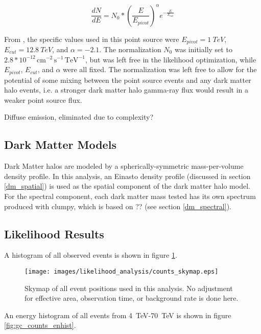  \begin{equation}\label{eqn:brokenplaw}
    \frac{dN}{dE} = N_{0} * { \left ( \frac{E}{E_{pivot}} \right ) }^{\alpha} {e}^{-\frac{E}{E_{cut}}}
  \end{equation}
  
  From \cite{VeritasGCRidge2015}, the specific values used in this point source were $E_{pivot}=\SI{1}{TeV}$, $E_{cut}=\SI{12.8}{TeV}$, and $\alpha=-2.1$.
  The normalization $N_{0}$ was initially set to $2.8*{10}^{-12}\,\text{cm}^{-2}\,\text{s}^{-1}\,\text{TeV}^{-1}$, but was left free in the likelihood optimization, while $E_{pivot}$, $E_{cut}$, and $\alpha$ were all fixed.
  The normalization was left free to allow for the potential of some mixing between the point source events and any dark matter halo events, i.e. a stronger dark matter halo gamma-ray flux would result in a weaker point source flux.
  
  Diffuse emission, eliminated due to complexity?

  \subsection{Dark Matter Models}
  Dark Matter halos are modeled by a spherically-symmetric mass-per-volume density profile.
  In this analysis, an Einasto density profile (discussed in section \ref{dm_spatial}) is used as the spatial component of the dark matter halo model.
  For the spectral component, each dark matter mass tested has its own spectrum produced with clumpy, which is based on ?? (see section \ref{dm_spectral}).

  \subsection{Likelihood Results}
  
  A histogram of all observed events is shown in figure \ref{fig:gc_counts_skymap}.
  
  \begin{figure}[ht]
    \centering
    \texttt{[image: images/likelihood\_analysis/counts\_skymap.eps]}
    \caption[Galactic Center Counts Skymap]{
      Skymap of all event positions used in this analysis.
      No adjustment for effective area, observation time, or background rate is done here.
    }
    \label{fig:gc_counts_skymap}
  \end{figure}

  An energy histogram of all events from \SI{4}{TeV}-\SI{70}{TeV} is shown in figure \ref{fig:gc_counts_enhist}.
  
